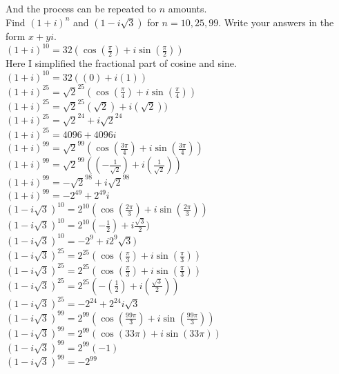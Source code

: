 \documentclass[12pt]{article}
\begin{document}
And the process can be repeated to $n$ amounts.\\



 Find $(1+i)^n$ and $(1-i\sqrt{3})$ for $n = 10,25,99$. Write your answers in the form $x + yi$.\\

$(1 + i)^{10} = 32(\cos(\frac{\pi}{2}) + i\sin(\frac{\pi}{2}))$\\
Here I simplified the fractional part of cosine and sine.\\
$(1+ i)^{10} = 32((0) + i(1))$\\


$(1 + i)^{25} = \sqrt{2}^{25}(\cos(\frac{\pi}{4}) + i\sin(\frac{\pi}{4}))$\\
$(1 + i)^{25} = \sqrt{2}^{25}(\sqrt{2}) + i(\sqrt{2}))$\\
$(1 + i)^{25} = \sqrt{2}^{24} + i\sqrt{2}^{24}$\\
$(1 + i)^{25} = 4096 + 4096i$\\


$(1 + i)^{99} = \sqrt{2}^{99}(\cos(\frac{3\pi}{4}) + i\sin(\frac{3\pi}{4}))$\\
$(1 + i)^{99} = \sqrt{2}^{99}((-\frac{1}{\sqrt{2}}) + i(\frac{1}{\sqrt{2}}))$\\
$(1 + i)^{99} = -\sqrt{2}^{98} + i\sqrt{2}^{98}$\\
$(1 + i)^{99} = -2^{49} + 2^{49}i$\\


$(1 - i\sqrt{3})^{10} = 2^{10}(\cos(\frac{2\pi}{3}) + i\sin(\frac{2\pi}{3}))$\\
$(1 - i\sqrt{3})^{10} = 2^{10}(-\frac{1}{2}) + i\frac{\sqrt{3}}{2})$\\
$(1 - i\sqrt{3})^{10} = -2^{9} + i2^{9}\sqrt{3})$\\

$(1 - i\sqrt{3})^{25} = 2^{25}(\cos(\frac{\pi}{3}) + i\sin(\frac{\pi}{3}))$\\
$(1 - i\sqrt{3})^{25} = 2^{25}(\cos(\frac{\pi}{3}) + i\sin(\frac{\pi}{3}))$\\
$(1 - i\sqrt{3})^{25} = 2^{25}(-(\frac{1}{2}) + i(\frac{\sqrt{3}}{2}))$\\
$(1 - i\sqrt{3})^{25} = -2^{24} + 2^{24}i\sqrt{3}$\\


$(1 - i\sqrt{3})^{99} = 2^{99}(\cos(\frac{99\pi}{3}) + i\sin(\frac{99\pi}{3}))$\\
$(1 - i\sqrt{3})^{99} = 2^{99}(\cos(33\pi) + i\sin(33\pi))$\\
$(1 - i\sqrt{3})^{99} = 2^{99}(-1)$\\
$(1 - i\sqrt{3})^{99} = -2^{99}$\\
\end{document}
